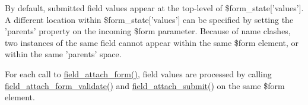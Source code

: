 By default, submitted field values appear at the top-\/level of \$form\_\-state\mbox{[}'values'\mbox{]}. A different location within \$form\_\-state\mbox{[}'values'\mbox{]} can be specified by setting the 'parents' property on the incoming \$form parameter. Because of name clashes, two instances of the same field cannot appear within the same \$form element, or within the same 'parents' space.

For each call to \hyperlink{group__field__attach_gac5bd0213dae78f7c1b3235f3acdde2c6}{field\_\-attach\_\-form()}, field values are processed by calling \hyperlink{group__field__attach_ga8c9a9775772774cefae4f6b9959d477e}{field\_\-attach\_\-form\_\-validate()} and \hyperlink{group__field__attach_ga756e59f651aa870ee79dd488b4e799c8}{field\_\-attach\_\-submit()} on the same \$form element.

